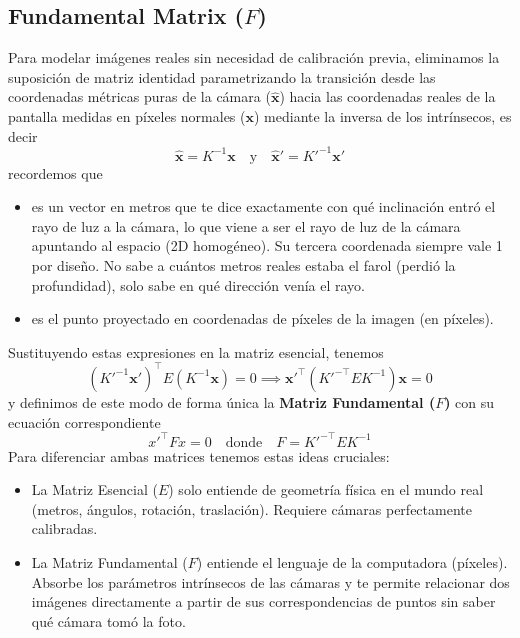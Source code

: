 \subsection{Fundamental Matrix ($F$)}
\noindent
Para modelar imágenes reales sin necesidad de calibración previa, eliminamos la suposición de matriz identidad parametrizando la transición desde las coordenadas métricas puras de la cámara ($\hat{\mathbf{x}}$) hacia las coordenadas reales de la pantalla medidas en píxeles normales ($\mathbf{x}$) mediante la inversa de los intrínsecos, es decir
\begin{equation}
    \hat{\mathbf{x}} = K^{-1}\mathbf{x} \quad \text{y} \quad \hat{\mathbf{x}}' = K'^{-1}\mathbf{x}' 
\end{equation}
recordemos que 
\begin{itemize}
    \item {} es un vector en metros que te dice exactamente con qué inclinación entró el rayo de luz a la cámara, lo que viene a ser el rayo de luz de la cámara apuntando al espacio (2D homogéneo). Su tercera coordenada siempre vale 1 por diseño. No sabe a cuántos metros reales estaba el farol (perdió la profundidad), solo sabe en qué dirección venía el rayo.
    \item {} es el punto proyectado en coordenadas de píxeles de la imagen (en píxeles).
\end{itemize}
Sustituyendo estas expresiones en la matriz esencial, tenemos
\begin{equation}
    (K'^{-1}\mathbf{x}')^{\top} E (K^{-1}\mathbf{x}) = 0 \implies \mathbf{x}'^{\top} (K'^{-\top} E K^{-1}) \mathbf{x} = 0
\end{equation}
y definimos de este modo de forma única la \textbf{Matriz Fundamental ($F$)} con su ecuación correspondiente
\begin{equation}
    \boxed{x'^{\top} F x = 0} \quad \text{donde} \quad F = K'^{-\top} E K^{-1}
\end{equation}
Para diferenciar ambas matrices tenemos estas ideas cruciales:
\begin{itemize}
    \item La Matriz Esencial ($E$) solo entiende de geometría física en el mundo real (metros, ángulos, rotación, traslación). Requiere cámaras perfectamente calibradas.
    \item La Matriz Fundamental ($F$) entiende el lenguaje de la computadora (píxeles). Absorbe los parámetros intrínsecos de las cámaras y te permite relacionar dos imágenes directamente a partir de sus correspondencias de puntos sin saber qué cámara tomó la foto.
\end{itemize}


